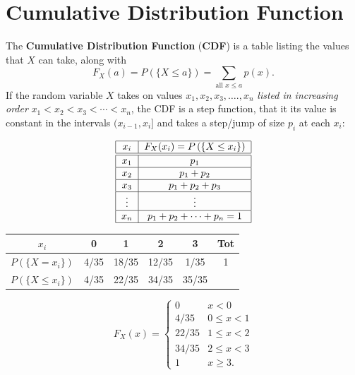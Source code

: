 \documentclass[smaller, handout]{beamer}\usepackage[]{graphicx}\usepackage[]{color}
\begin{document}
\section{Cumulative Distribution Function}
\begin{frame}{\secname}
\begin{footnotesize}
  The \textbf{Cumulative Distribution Function} (\textbf{CDF}) is a
  table listing the values that $X$ can take, along with
  $$
  F_X(a) = P \left(\{ X\leq a\}\right)= \sum_{\text{all \ \ } x \leq a } p(x).
  $$
  If the random variable $X$ takes on values $x_{1},x_{2},x_{3},\ldots .,x_{n}$ \emph{listed in
  increasing order } $
  x_{1}<x_{2}<x_{3}<\cdots <x_{n}
  $, the CDF is a step function, that it its value is constant in the intervals $(x_{i-1},x_i]$ and takes a step/jump of size $p_i$
  at each $x_i$:
  \vspace{0.1cm}

  \begin{equation*}
  \begin{tabular}{|c|c|}
  \hline
  $x_i $ & $F_X(x_i) =P \left(\{ X\leq x_i\}\right) $ \\ \hline\hline
  $x_{1}$ & $p_{1}$ \\ \hline
  $x_{2}$ & $p_{1}+p_{2}$ \\ \hline
  $x_{3}$ & $p_{1}+p_{2}+p_{3}$ \\ \hline
  $\vdots $ & $\vdots $ \\ \hline
  $x_{n}$ & $p_{1}+p_{2}+\cdots +p_{n}=1$ \\ \hline
  \end{tabular}
  \end{equation*}
  \vspace{0.2cm}
  \end{footnotesize}
\end{frame}

\begin{frame}{\secname}
  \begin{example}
  \noindent
  \begin{center}
  \begin{tabular}{c|cccc|c}
  $x_i$ & 0 & 1 & 2 & 3 & Tot \\ \hline
  $P(\{X=x_i\})$ & 4/35 & 18/35 & 12/35 & 1/35 & 1 \\
  $P(\{X\leq x_i\})$ & 4/35 & 22/35 & 34/35 & 35/35 &
  \end{tabular}
  \end{center}
  \bigskip
  $$F_X(x) = \left\{
  \begin{array}{ll}
  0 & x<0 \\
  4/35 & 0 \leq x < 1\\
  22/35 & 1 \leq x < 2\\
  34/35 & 2 \leq x < 3 \\
  1 & x \geq 3.
  \end{array} \right.$$
  \end{example}
\end{frame}
\end{document}
